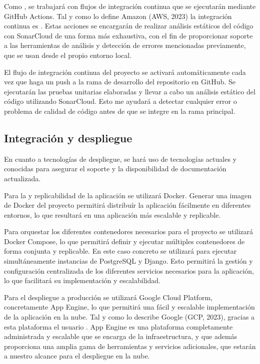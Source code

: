 Como , se trabajará con flujos de integración continua que se ejecutarán mediante GitHub Actions. Tal y como lo define Amazon (AWS, 2023) la integración continua es . Estas acciones se encargarán de realizar análisis estáticos del código con SonarCloud de una forma más exhaustiva, con el fin de proporcionar soporte a las herramientas de análisis y detección de errores mencionadas previamente, que se usan desde el propio entorno local.

El flujo de integración continua del proyecto se activará automáticamente cada vez que haga un push a la rama de desarrollo del repositorio en GitHub. Se ejecutarán las pruebas unitarias elaboradas y llevar a cabo un análisis estático del código utilizando SonarCloud. Esto me ayudará a detectar cualquier error o problema de calidad de código antes de que se integre en la rama principal.


\subsection{Integración y despliegue}
En cuanto a tecnologías de despliegue, se hará uso de tecnologías actuales y conocidas para asegurar el soporte y la disponibilidad de documentación actualizada.

Para la  y replicabilidad de la aplicación se utilizará Docker. Generar una imagen de Docker del proyecto permitirá distribuír la aplicación fácilmente en diferentes entornos, lo que resultará en una aplicación más escalable y replicable.

Para orquestar los diferentes contenedores necesarios para el proyecto se utilizará Docker Compose, lo que permitirá definir y ejecutar múltiples contenedores de forma conjunta y replicable. En este caso concreto se utilizará para ejecutar simultáneamente instancias de PostgreSQL y Django. Esto permitirá la gestión y configuración centralizada de los diferentes servicios necesarios para la aplicación, lo que facilitará su implementación y escalabilidad.

Para el despliegue a producción se utilizará Google Cloud Platform, concretamente App Engine, lo que permitirá una fácil y escalable implementación de la aplicación en la nube. Tal y como lo describe Google (GCP, 2023), gracias a esta plataforma el usuario . App Engine es una plataforma completamente administrada y escalable que se encarga de la infraestructura, y que además proporciona una amplia gama de herramientas y servicios adicionales, que estarán a nuestro alcance para el despliegue en la nube.

